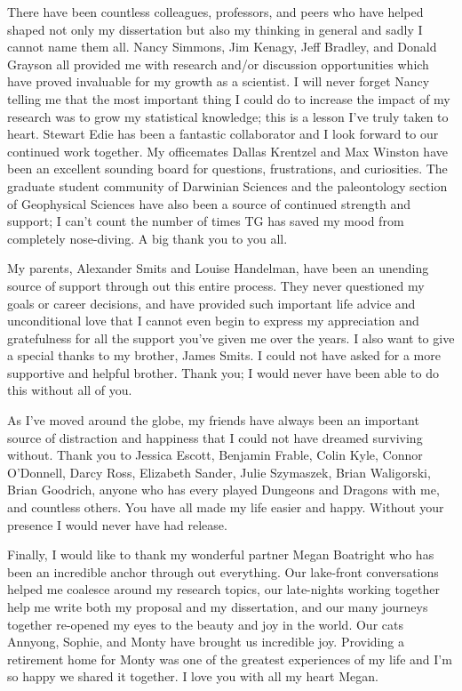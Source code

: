 \documentclass{ucetd}  %
\begin{document}
There have been countless colleagues, professors, and peers who have helped shaped not only my dissertation but also my thinking in general and sadly I cannot name them all. Nancy Simmons, Jim Kenagy, Jeff Bradley, and Donald Grayson all provided me with research and/or discussion opportunities which have proved invaluable for my growth as a scientist. I will never forget Nancy telling me that the most important thing I could do to increase the impact of my research was to grow my statistical knowledge; this is a lesson I've truly taken to heart. Stewart Edie has been a fantastic collaborator and I look forward to our continued work together. My officemates Dallas Krentzel and Max Winston have been an excellent sounding board for questions, frustrations, and curiosities. The graduate student community of Darwinian Sciences and the paleontology section of Geophysical Sciences have also been a source of continued strength and support; I can't count the number of times TG has saved my mood from completely nose-diving. A big thank you to you all.


My parents, Alexander Smits and Louise Handelman, have been an unending source of support through out this entire process. They never questioned my goals or career decisions, and have provided such important life advice and unconditional love that I cannot even begin to express my appreciation and gratefulness for all the support you've given me over the years. I also want to give a special thanks to my brother, James Smits. I could not have asked for a more supportive and helpful brother. Thank you; I would never have been able to do this without all of you.

As I've moved around the globe, my friends have always been an important source of distraction and happiness that I could not have dreamed surviving without. Thank you to Jessica Escott, Benjamin Frable, Colin Kyle, Connor O'Donnell, Darcy Ross, Elizabeth Sander, Julie Szymaszek, Brian Waligorski, Brian Goodrich, anyone who has every played Dungeons and Dragons with me, and countless others. You have all made my life easier and happy. Without your presence I would never have had release.

Finally, I would like to thank my wonderful partner Megan Boatright who has been an incredible anchor through out everything. Our lake-front conversations helped me coalesce around my research topics, our late-nights working together help me write both my proposal and my dissertation, and our many journeys together re-opened my eyes to the beauty and joy in the world. Our cats Annyong, Sophie, and Monty have brought us incredible joy. Providing a retirement home for Monty was one of the greatest experiences of my life and I'm so happy we shared it together. I love you with all my heart Megan.
\end{document}

